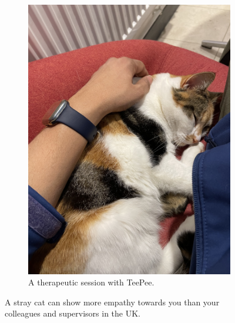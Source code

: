 \documentclass[a4paper,11pt]{extarticle}
\begin{document}
\begin{figure}
\begin{subfigure}{.5\textwidth}
  \centering
  \includegraphics[scale=0.07]{figures/teepee_2.jpg}
  \caption{A therapeutic session with TeePee.}
  \label{fig:teepee_2}
\end{subfigure}
\caption{A stray cat can show more empathy towards you than your colleagues and supervisors in the UK.}
\label{fig:fig}
\end{figure}
\end{document}
